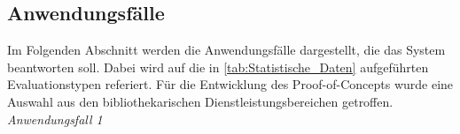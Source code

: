


\subsection{Anwendungsfälle}
\label{chap:four_one_five}
Im Folgenden Abschnitt werden die Anwendungsfälle dargestellt, die das System beantworten soll. Dabei wird auf die in \autoref{tab:Statistische_Daten} aufgeführten
Evaluationstypen referiert. Für die Entwicklung des Proof-of-Concepts wurde eine Auswahl aus den bibliothekarischen Dienstleistungsbereichen getroffen.\\


\noindent
\textit{Anwendungsfall 1}

